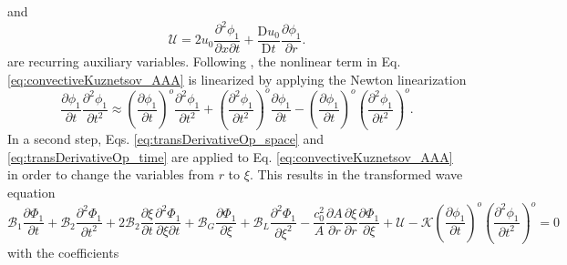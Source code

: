 and
\begin{equation}
    \mathcal{U} = 2u_0\dfrac{\partial^2 \phi_1}{\partial x\partial t} + \dfrac{\mathrm{D}u_0}{\mathrm{D}t}\dfrac{\partial\phi_1}{\partial r}.
    \label{eq:Uterm}
\end{equation}
are recurring auxiliary variables. Following \citet{Solovchuk_et_al_2013}, the nonlinear term in Eq. \eqref{eq:convectiveKuznetsov_AAA} is linearized by applying the Newton linearization
\begin{equation}
    \dfrac{\partial \phi_1}{\partial t}\dfrac{\partial^2 \phi_1}{\partial t^2} \approx
    \left(\dfrac{\partial \phi_1}{\partial t}\right)^o\dfrac{\partial^2 \phi_1}{\partial t^2}
    +
    \left(\dfrac{\partial^2 \phi_1}{\partial t^2}\right)^o\dfrac{\partial \phi_1}{\partial t}
    - \left(\dfrac{\partial \phi_1}{\partial t}\right)^o\left(\dfrac{\partial^2 \phi_1}{\partial t^2}\right)^o.
    \label{eq:NewtonLin}
\end{equation}
In a second step, Eqs. \eqref{eq:transDerivativeOp_space} and \eqref{eq:transDerivativeOp_time} are applied to Eq. \eqref{eq:convectiveKuznetsov_AAA} in order to change the variables from $r$ to $\xi$. This results in the transformed wave equation
\begin{equation}
    \mathcal{B}_1 \dfrac{\partial \Phi_1}{\partial t}
    + \mathcal{B}_2 \dfrac{\partial^2 \Phi_1}{\partial t^2}
    + 2\mathcal{B}_2 \dfrac{\partial \xi}{\partial t} \dfrac{\partial^2 \Phi_1}{\partial \xi\partial t}
    + \mathcal{B}_G \dfrac{\partial \Phi_1}{\partial \xi}
    + \mathcal{B}_L \dfrac{\partial^2 \Phi_1}{\partial \xi^2}
    - \dfrac{c_0^2}{A}\dfrac{\partial A}{\partial r} \dfrac{\partial \xi}{\partial r}\dfrac{\partial \Phi_1}{\partial \xi}
    + \mathcal{U}
    - \mathcal{K}\left(\dfrac{\partial \phi_1}{\partial t}\right)^o\left(\dfrac{\partial^2 \phi_1}{\partial t^2}\right)^o
    = 0
    \label{eq:convectiveKuznetsov_BBB}
\end{equation}
with the coefficients
